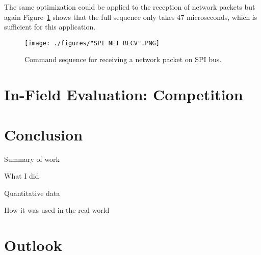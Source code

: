 The same optimization could be applied to the reception of network packets but again Figure~\ref{fig:net_recv} shows that the full sequence only takes 47 microseconds, which is sufficient for this application. 

\begin{figure}[H]
    \centering \texttt{[image: ./figures/"SPI NET RECV".PNG]}
    \caption{Command sequence for receiving a network packet on SPI bus.}
    \label{fig:net_recv}
\end{figure}


\section{In-Field Evaluation: Competition}




\section{Conclusion}

Summary of work

What I did

Quantitative data

How it was used in the real world

\section{Outlook}